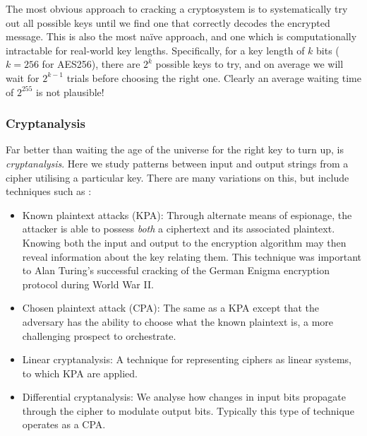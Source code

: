 The most obvious approach to cracking a cryptosystem is to systematically try out all possible keys until we find one that correctly decodes the encrypted message. This is also the most na\"ive approach, and one which is computationally intractable for real-world key lengths. Specifically, for a key length of $k$ bits (\mbox{$k=256$} for AES256), there are $2^k$ possible keys to try, and on average we will wait for $2^{k-1}$ trials before choosing the right one. Clearly an average waiting time of $2^{255}$ is not plausible!

%
%

\subsubsection{Cryptanalysis}

Far better than waiting the age of the universe for the right key to turn up, is \textit{cryptanalysis}. Here we study patterns between input and output strings from a cipher utilising a particular key. There are many variations on this, but include techniques such as \cite{bib:Schneier96}:

\begin{itemize}
	\item Known plaintext attacks (KPA): Through alternate means of espionage, the attacker is able to possess \textit{both} a ciphertext and its associated plaintext. Knowing both the input and output to the encryption algorithm may then reveal information about the key relating them. This technique was important to Alan Turing's successful cracking of the German Enigma encryption protocol during World War II.
	\item Chosen plaintext attack (CPA): The same as a KPA except that the adversary has the ability to choose what the known plaintext is, a more challenging prospect to orchestrate.
	\item Linear cryptanalysis: A technique for representing ciphers as linear systems, to which KPA are applied.
	\item Differential cryptanalysis: We analyse how changes in input bits propagate through the cipher to modulate output bits. Typically this type of technique operates as a CPA.
\end{itemize}
 
%
%
 
